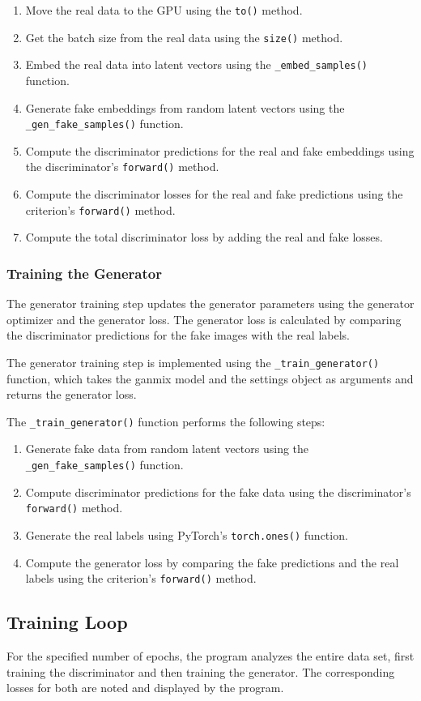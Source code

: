\begin{enumerate}
    \item Move the real data to the \ac{GPU} using the \texttt{to()} method.
    \item Get the batch size from the real data using the \texttt{size()} method.
    \item Embed the real data into latent vectors using the \texttt{\_embed\_samples()} function.
    \item Generate fake embeddings from random latent vectors using the \texttt{\_gen\_fake\_samples()} function.
    \item Compute the discriminator predictions for the real and fake embeddings using the discriminator's \texttt{forward()} method.
    \item Compute the discriminator losses for the real and fake predictions using the criterion's \texttt{forward()} method.
    \item Compute the total discriminator loss by adding the real and fake losses.
\end{enumerate}

\subsubsection{Training the Generator}

The generator training step updates the generator parameters using the generator optimizer and the generator loss. The generator loss is calculated by comparing the discriminator predictions for the fake images with the real labels.

The generator training step is implemented using the \texttt{\_train\_generator()} function, which takes the ganmix model and the settings object as arguments and returns the generator loss.

The \texttt{\_train\_generator()} function performs the following steps:

\begin{enumerate}
    \item Generate fake data from random latent vectors using the \texttt{\_gen\_fake\_samples()} function.
    \item Compute discriminator predictions for the fake data using the discriminator's \texttt{forward()} method.
    \item Generate the real labels using PyTorch's \texttt{torch.ones()} function.
    \item Compute the generator loss by comparing the fake predictions and the real labels using the criterion's \texttt{forward()} method.
\end{enumerate}

\subsection{Training Loop}


For the specified number of epochs, the program analyzes the entire data set, first training the discriminator and then training the generator. The corresponding losses for both are noted and displayed by the program.